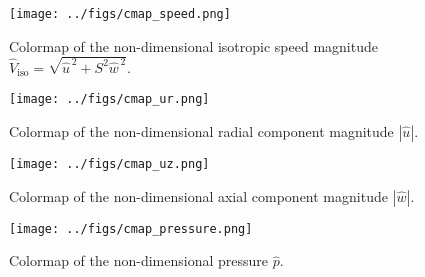 \documentclass[11pt,a4paper]{article}
\begin{document}
\begin{figure}[t]
  \centering
  \texttt{[image: ../figs/cmap\_speed.png]}
  \caption{Colormap of the non-dimensional isotropic speed magnitude $\hat V_{\mathrm{iso}}=\sqrt{\hat u^{\,2}+S^{2}\hat w^{\,2}}$.}
  \label{fig:cmap_speed}
\end{figure}

\begin{figure}[t]
  \centering
  \texttt{[image: ../figs/cmap\_ur.png]}
  \caption{Colormap of the non-dimensional radial component magnitude $|\hat u|$.}
  \label{fig:cmap_ur}
\end{figure}

\begin{figure}[t]
  \centering
  \texttt{[image: ../figs/cmap\_uz.png]}
  \caption{Colormap of the non-dimensional axial component magnitude $|\hat w|$.}
  \label{fig:cmap_uz}
\end{figure}

\begin{figure}[t]
  \centering
  \texttt{[image: ../figs/cmap\_pressure.png]}
  \caption{Colormap of the non-dimensional pressure $\hat p$.}
  \label{fig:cmap_p}
\end{figure}
\end{document}
